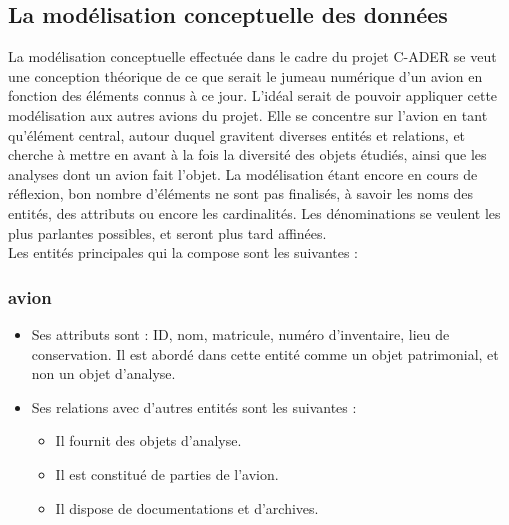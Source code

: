         \subsection{La modélisation conceptuelle des données} 
        
La modélisation conceptuelle effectuée dans le cadre du projet C-ADER se veut une conception théorique de ce que serait le jumeau numérique d'un avion en fonction des éléments connus à ce jour. L'idéal serait de pouvoir appliquer cette modélisation aux autres avions du projet. Elle se concentre sur l'avion en tant qu'élément central, autour duquel gravitent diverses entités et relations, et cherche à mettre en avant à la fois la diversité des objets étudiés, ainsi que les analyses dont un avion fait l'objet. La modélisation étant encore en cours de réflexion, bon nombre d’éléments ne sont pas finalisés, à savoir les noms des entités, des attributs ou encore les cardinalités. Les dénominations se veulent les plus parlantes possibles, et seront plus tard affinées.\\

Les entités principales qui la compose sont les suivantes :

		\subsubsection{avion} 
\begin{itemize}
    \item Ses attributs sont : ID, nom, matricule, numéro d'inventaire, lieu de conservation. Il est abordé dans cette entité comme un objet patrimonial, et non un objet d’analyse.
    \item Ses relations avec d’autres entités sont les suivantes :
    \begin{itemize}
        \item Il fournit des objets d’analyse.
        \item Il est constitué de parties de l'avion.
        \item Il dispose de documentations et d’archives.
    \end{itemize}
\end{itemize}

